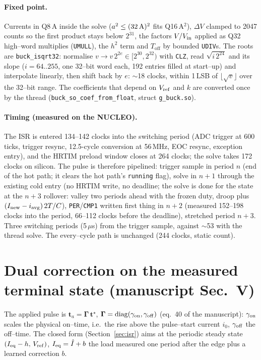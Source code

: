 \documentclass[11pt]{article}
\newcommand{\Toff}{T_{\mathrm{off}}}
\begin{document}
\paragraph{Fixed point.} Currents in Q8\,A inside the solve ($a^2\le(32\,{\rm A})^2$
fits Q16\,A$^2$), $\Delta V$ clamped to 2047 counts so the first product stays below
$2^{31}$, the factors $V/V_{\rm in}$ applied as Q32 high--word multiplies
(\texttt{UMULL}), the $h^2$ term and $\Toff$ by bounded \texttt{UDIV}s. The roots are \texttt{buck\_isqrt32}: normalise $v\to v\,2^{2e}\in[2^{30},2^{32})$
with \texttt{CLZ}, read $\sqrt{i\,2^{24}}$ and its slope ($i=64..255$, one 32--bit word
each, 192 entries filled at start--up) and interpolate linearly, then shift back by
$e$: $\sim$18 clocks, within 1\,LSB of $\lfloor\sqrt v\rfloor$ over the 32--bit
range. The coefficients that depend on $V_{\rm ref}$ and $k$ are converted once by
the thread (\texttt{buck\_so\_coef\_from\_float}, struct \texttt{g\_buck.so}).

\paragraph{Timing (measured on the NUCLEO).} The ISR is entered 134--142
clocks into the switching period (ADC trigger at 600 ticks, trigger resync,
12.5-cycle conversion at 56\,MHz, EOC resync, exception entry), and the HRTIM
preload window closes at 264 clocks; the solve takes 172 clocks on silicon.
The pulse is therefore pipelined: trigger sample in period $n$ (end of the
hot path; it clears the hot path's \texttt{running} flag), solve in $n+1$ through
the existing cold entry (no HRTIM write, no deadline; the solve is done for
the state at the $n+3$ rollover: valley two periods ahead with the frozen
duty, droop plus $(I_{\rm new}-i_{\rm avg})\,2T/C$), \texttt{PER}/\texttt{CMP1}
written first thing in $n+2$ (measured 152--198 clocks into the period, 66--112
clocks before the deadline), stretched period $n+3$. Three switching periods
(5\,$\mu$s) from the trigger sample, against $\sim$53 with the thread solve.
The every--cycle path is unchanged (244 clocks, static count).

\section{Dual correction on the measured terminal state (manuscript Sec.~V)}\label{sec:jac}
The applied pulse is $\mathbf t_a=\boldsymbol\Gamma\,\mathbf t^\star$,
$\boldsymbol\Gamma=\mathrm{diag}(\gamma_{\rm on},\gamma_{\rm off})$ (eq.~40 of
the manuscript): $\gamma_{\rm on}$ scales the physical on--time, i.e.\ the rise
above the pulse--start current $i_0$, $\gamma_{\rm off}$ the off--time. The
closed form (Section~\ref{sec:isr}) aims at the periodic steady state
$(I_{\rm eq}-h,\,V_{\rm ref})$, $I_{\rm eq}=\hat I+b$ the load measured one period
after the edge plus a learned correction $b$.
\end{document}
